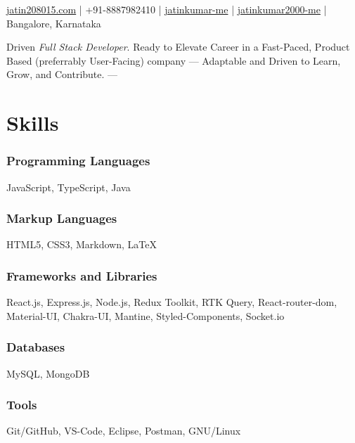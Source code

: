 \documentclass[a4paper]{article}
\author{Jatin Kumar}
\begin{document}
\begin{center}
	\makeatletter
	\centering {\huge \@author}
	\makeatother
	\vspace{6pt}

	\href{mailto:jatin208015\@gmail.com}{{\faAt} jatin208015\@gmail.com} |
	{\faPhone } +91-8887982410 |
	\href{https://github.com/jatinkumar-me}{{\faGithub} jatinkumar-me} |
	\href{https://www.linkedin.com/in/jatinkumar-2000-me/}{{\faLinkedin} {jatinkumar2000-me}} |
	{\faMapMarker} Bangalore, Karnataka
\end{center}

\vspace{-6pt}
\hrulefill
\vspace{3pt}

\begin{center}
Driven \textit{Full Stack Developer}. Ready to Elevate Career in a Fast-Paced, Product Based (preferrably User-Facing) company — Adaptable and Driven to Learn, Grow, and Contribute. --- 
\end{center}

\section{Skills}
\subsubsection*{Programming Languages}
JavaScript, TypeScript, Java
\vspace{-10pt}
\subsubsection*{Markup Languages}
HTML5, CSS3, Markdown, \LaTeX
\vspace{-10pt}
\subsubsection*{Frameworks and Libraries}
React.js, Express.js, Node.js, Redux Toolkit, RTK Query, React-router-dom, Material-UI, Chakra-UI, Mantine, Styled-Components, Socket.io
\vspace{-10pt}
\subsubsection*{Databases}
MySQL, MongoDB
\vspace{-10pt}
\subsubsection*{Tools}
Git/GitHub, VS-Code, Eclipse, Postman, GNU/Linux
\end{document}

